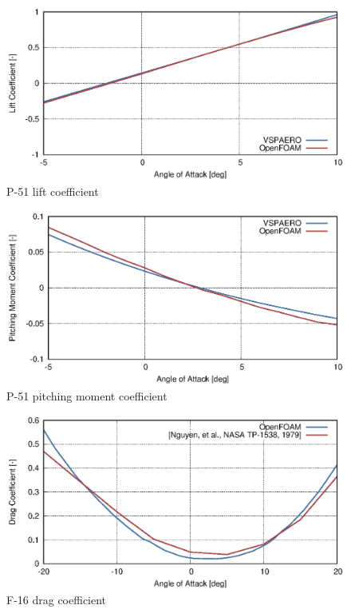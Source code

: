 \begin{figure}
  \centering
  \includegraphics[width=140mm]{images/vspaero_p51_cz.eps}
  \caption{P-51 lift coefficient}
  \label{fig-cfd-result-vspaero-cz}
\end{figure}

\begin{figure}
  \centering
  \includegraphics[width=140mm]{images/vspaero_p51_cm.eps}
  \caption{P-51 pitching moment coefficient}
  \label{fig-cfd-result-vspaero-cm}
\end{figure}

\begin{figure}
  \centering
  \includegraphics[width=140mm]{images/openfoam_f16_cx.eps}
  \caption{F-16 drag coefficient}
  \label{fig-cfd-result-openfoam-cx}
\end{figure}

